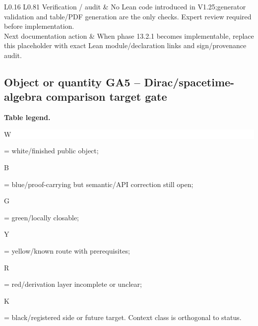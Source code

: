 \begin{longtable}{L{0.16\linewidth} L{0.81\linewidth}}
\hline\addlinespace[0.20em]
Verification /\allowbreak{} audit & No Lean code introduced in V1.25;\newline generator validation and table/\allowbreak{}PDF generation are the only checks. Expert review required before implementation.\\
\hline\addlinespace[0.20em]
Next documentation action & When phase 13.2.1 becomes implementable, replace this placeholder with exact Lean module/\allowbreak{}declaration links and sign/\allowbreak{}provenance audit.\\
\hline\addlinespace[0.20em]
\end{longtable}
\subsection*{Object or quantity GA5 -- Dirac/\allowbreak{}spacetime-algebra comparison target gate}
\hypertarget{objproof:GA5}{}
\par\smallskip\noindent\begin{minipage}{0.99\linewidth}\footnotesize\raggedright\textbf{Table legend.} \colorbox{white}{\strut W} = white/finished public object; \colorbox{cyan!20}{\strut B} = blue/proof-carrying but semantic/API correction still open; \colorbox{green!18}{\strut G} = green/locally closable; \colorbox{yellow!25}{\strut Y} = yellow/known route with prerequisites; \colorbox{red!20}{\strut R} = red/derivation layer incomplete or unclear; \colorbox{black!18}{\strut K} = black/registered side or future target. Context class is orthogonal to status.\end{minipage}\par\vspace{0.25em}
